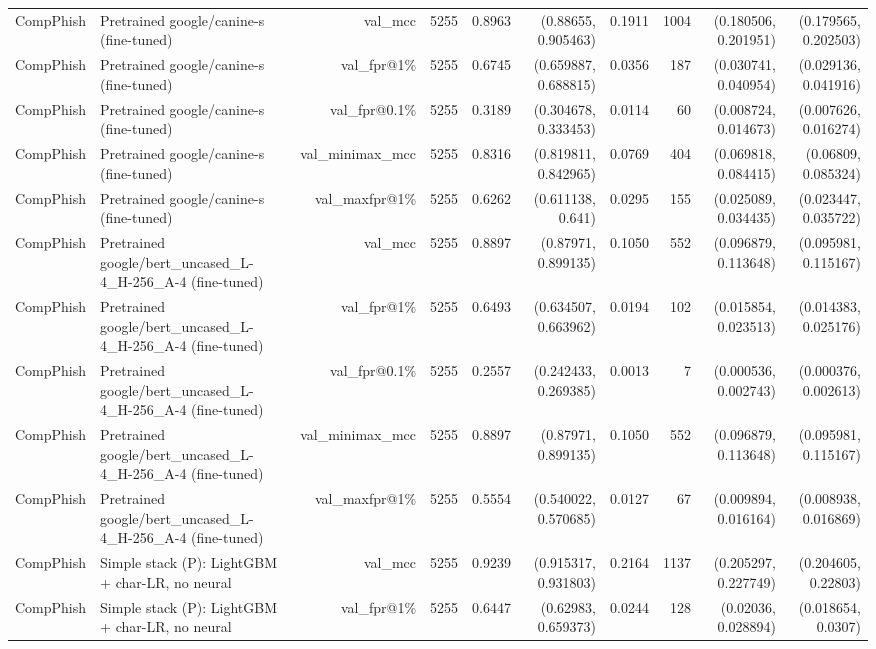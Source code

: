 \begin{table}[t]
\begin{tabular}{llrrrrrrrr}
CompPhish & Pretrained google/canine-s (fine-tuned) & val\_mcc & 5255 & 0.8963 & (0.88655, 0.905463) & 0.1911 & 1004 & (0.180506, 0.201951) & (0.179565, 0.202503) \\
CompPhish & Pretrained google/canine-s (fine-tuned) & val\_fpr@1\% & 5255 & 0.6745 & (0.659887, 0.688815) & 0.0356 & 187 & (0.030741, 0.040954) & (0.029136, 0.041916) \\
CompPhish & Pretrained google/canine-s (fine-tuned) & val\_fpr@0.1\% & 5255 & 0.3189 & (0.304678, 0.333453) & 0.0114 & 60 & (0.008724, 0.014673) & (0.007626, 0.016274) \\
CompPhish & Pretrained google/canine-s (fine-tuned) & val\_minimax\_mcc & 5255 & 0.8316 & (0.819811, 0.842965) & 0.0769 & 404 & (0.069818, 0.084415) & (0.06809, 0.085324) \\
CompPhish & Pretrained google/canine-s (fine-tuned) & val\_maxfpr@1\% & 5255 & 0.6262 & (0.611138, 0.641) & 0.0295 & 155 & (0.025089, 0.034435) & (0.023447, 0.035722) \\
CompPhish & Pretrained google/bert\_uncased\_L-4\_H-256\_A-4 (fine-tuned) & val\_mcc & 5255 & 0.8897 & (0.87971, 0.899135) & 0.1050 & 552 & (0.096879, 0.113648) & (0.095981, 0.115167) \\
CompPhish & Pretrained google/bert\_uncased\_L-4\_H-256\_A-4 (fine-tuned) & val\_fpr@1\% & 5255 & 0.6493 & (0.634507, 0.663962) & 0.0194 & 102 & (0.015854, 0.023513) & (0.014383, 0.025176) \\
CompPhish & Pretrained google/bert\_uncased\_L-4\_H-256\_A-4 (fine-tuned) & val\_fpr@0.1\% & 5255 & 0.2557 & (0.242433, 0.269385) & 0.0013 & 7 & (0.000536, 0.002743) & (0.000376, 0.002613) \\
CompPhish & Pretrained google/bert\_uncased\_L-4\_H-256\_A-4 (fine-tuned) & val\_minimax\_mcc & 5255 & 0.8897 & (0.87971, 0.899135) & 0.1050 & 552 & (0.096879, 0.113648) & (0.095981, 0.115167) \\
CompPhish & Pretrained google/bert\_uncased\_L-4\_H-256\_A-4 (fine-tuned) & val\_maxfpr@1\% & 5255 & 0.5554 & (0.540022, 0.570685) & 0.0127 & 67 & (0.009894, 0.016164) & (0.008938, 0.016869) \\
CompPhish & Simple stack (P): LightGBM + char-LR, no neural & val\_mcc & 5255 & 0.9239 & (0.915317, 0.931803) & 0.2164 & 1137 & (0.205297, 0.227749) & (0.204605, 0.22803) \\
CompPhish & Simple stack (P): LightGBM + char-LR, no neural & val\_fpr@1\% & 5255 & 0.6447 & (0.62983, 0.659373) & 0.0244 & 128 & (0.02036, 0.028894) & (0.018654, 0.0307) \\

\end{tabular}
\end{table}
